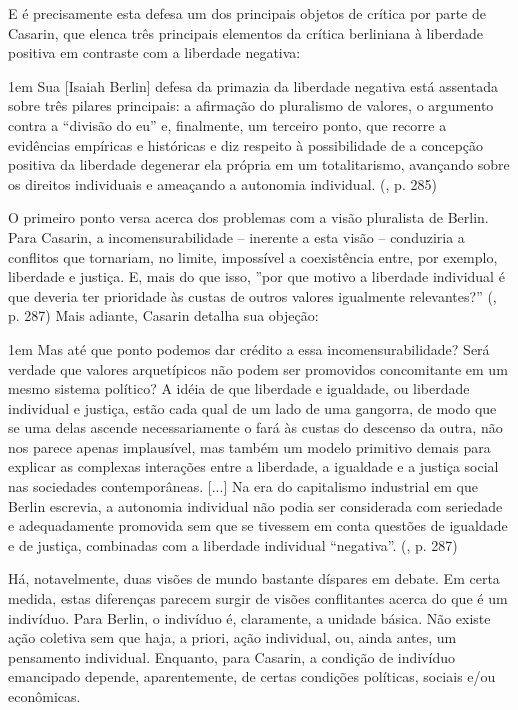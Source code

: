 \documentclass[12pt,a4paper]{article}
\newenvironment{citac}
{
	\begin{addmargin}
		[4cm]{1em} \footnotesize}{\normalfont 
	\end{addmargin}
}
\begin{document}
	E é precisamente esta defesa um dos principais objetos de crítica 
	por parte de Casarin, que elenca três principais elementos da 
	crítica berliniana à liberdade positiva em contraste com a liberdade 
	negativa: 

	\begin{citac}
		Sua [Isaiah Berlin] defesa da primazia da liberdade negativa
		está assentada sobre três pilares principais: a afirmação 
		do pluralismo de valores, o argumento contra a “divisão do 
		eu” e, finalmente, um terceiro ponto, que recorre a 
		evidências empíricas e históricas e diz respeito à 
		possibilidade de a concepção positiva da liberdade degenerar 
		ela própria em um totalitarismo, avançando sobre os direitos 
		individuais e ameaçando a autonomia individual. 
		(\cite{casarin}, p. 285)
	\end{citac}

	O primeiro ponto versa acerca dos problemas com a visão pluralista de 
	Berlin. Para Casarin, a incomensurabilidade -- inerente a esta visão --
	conduziria a conflitos que tornariam, no limite, impossível a 
	coexistência entre, por exemplo, liberdade e justiça. E, mais do que 
	isso, ”por que motivo a liberdade individual é que deveria ter 
	prioridade às custas de outros valores igualmente relevantes?” 
	(\cite{casarin}, p. 287) Mais adiante, Casarin detalha sua objeção: 

	\begin{citac}
		Mas até que ponto podemos dar crédito a essa
		incomensurabilidade? Será verdade que valores
		arquetípicos não podem ser promovidos
		concomitante em um mesmo sistema político? A
		idéia de que liberdade e igualdade, ou liberdade
		individual e justiça, estão cada qual de um lado de
		uma gangorra, de modo que se uma delas ascende 
		necessariamente o fará às custas do descenso
		da outra, não nos parece apenas implausível, mas
		também um modelo primitivo demais para explicar 
		as complexas interações entre a liberdade, a 
		igualdade e a justiça social nas sociedades contemporâneas. 
		[...]
		Na era do capitalismo industrial em que Berlin escrevia, a
		autonomia individual não podia ser considerada 
		com seriedade e adequadamente promovida sem
		que se tivessem em conta questões de igualdade e
		de justiça, combinadas com a liberdade individual “negativa”.
		(\cite{casarin}, p. 287)
	\end{citac}

	Há, notavelmente, duas visões de mundo bastante díspares em debate. 
	Em certa medida, estas diferenças parecem surgir de visões 
	conflitantes acerca do que é um indivíduo. Para Berlin, o indivíduo 
	é, claramente, a unidade básica. Não existe ação coletiva sem que 
	haja, a priori, ação individual, ou, ainda antes, um pensamento 
	individual. Enquanto, para Casarin, a condição de indivíduo 
	emancipado depende, aparentemente, de certas condições políticas, 
	sociais e/ou econômicas. 
\end{document}
